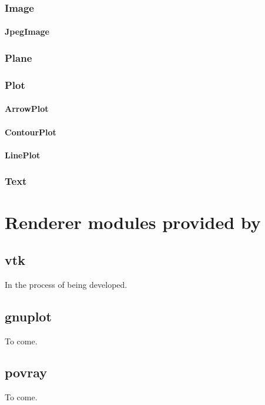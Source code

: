 \subsection{Image}

\subsubsection{JpegImage}

\subsection{Plane}

\subsection{Plot}

\subsubsection{ArrowPlot}

\subsubsection{ContourPlot}

\subsubsection{LinePlot}

\subsection{Text}


\chapter{Renderer modules provided by \pyvisi}

\section{vtk}

In the process of being developed.

\section{gnuplot}

To come.

\section{povray}

To come.

